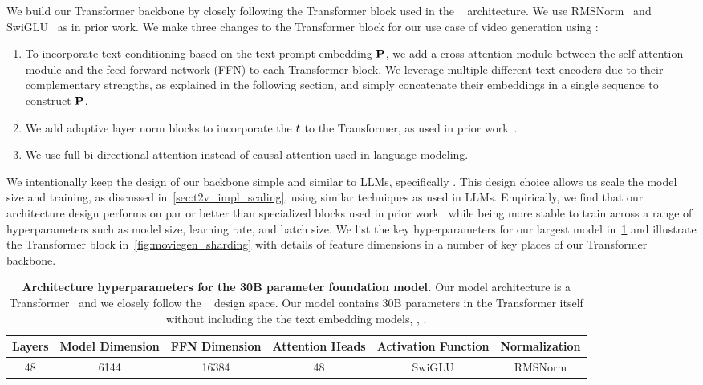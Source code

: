 We build our Transformer backbone by closely following the Transformer block used in the \llama~\citep{llama3} architecture.
We use RMSNorm~\citep{zhang2019root} and SwiGLU~\citep{shazeer2020glu} as in prior work.
We make three changes to the \llama Transformer block for our use case of video generation using \flowmatching:
\begin{enumerate}
  \item To incorporate text conditioning based on the text prompt embedding $\mathbf{P}$, we add a cross-attention module between the self-attention module and the feed forward network (FFN) to each Transformer block. We leverage multiple different text encoders due to their complementary strengths, as explained in the following section, and simply concatenate their embeddings in a single sequence to construct $\mathbf{P}$.
  \item We add adaptive layer norm blocks to incorporate the \timestep $t$ to the Transformer, as used in prior work~\citep{dit}.
  \item We use full bi-directional attention instead of causal attention used in language modeling.
\end{enumerate}


We intentionally keep the design of our backbone simple and similar to LLMs, specifically \llama.
This design choice allows us scale the model size and training, as discussed in~\cref{sec:t2v_impl_scaling}, using similar techniques as used in LLMs.
Empirically, we find that our architecture design performs on par or better than specialized blocks used in prior work~\citep{balaji2022ediffi,sd3} while being more stable to train across a range of hyperparameters such as model size, learning rate, and batch size.
We list the key hyperparameters for our largest model in~\cref{tab:t2v_hyperparameters} and illustrate the Transformer block in~\cref{fig:moviegen_sharding} with details of feature dimensions in a number of key places of our Transformer backbone.


\begin{table}[t]
  \centering
  \small
  \begin{tabular}{cccccc}
  \toprule
  Layers & Model Dimension & FFN Dimension & Attention Heads & Activation Function & Normalization	\\
  \midrule
  48 & 6144 & 16384 & 48 & SwiGLU & RMSNorm \\
  \bottomrule
  \end{tabular}%
  \caption{\textbf{Architecture hyperparameters for the \OursVideo 30B parameter foundation model.} Our model architecture is a Transformer~\citep{vaswani2017attention} and we closely follow the \llama~\citep{llama3} design space.
  Our model contains 30B parameters in the Transformer itself without including the the text embedding models, \taeShort, \etc.
  }
  \label{tab:t2v_hyperparameters}
  \end{table}

